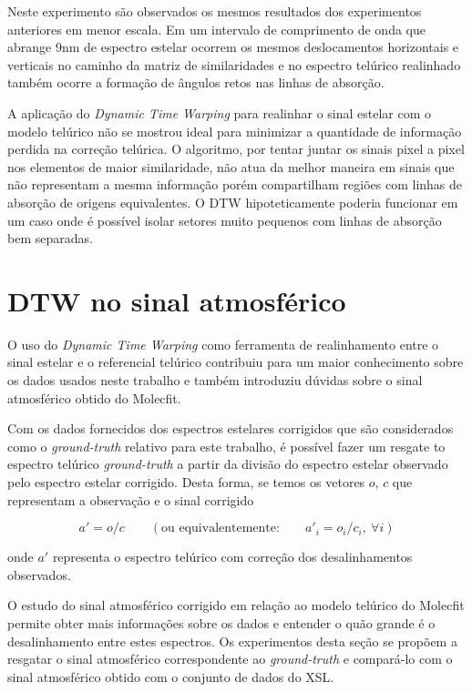 Neste experimento são observados os mesmos resultados dos experimentos anteriores em menor escala. Em um intervalo de comprimento de onda que abrange 9nm de espectro estelar ocorrem os mesmos deslocamentos horizontais e verticais no caminho da matriz de similaridades e no espectro telúrico realinhado também ocorre a formação de ângulos retos nas linhas de absorção.

A aplicação do \textit{Dynamic Time Warping} para realinhar o sinal estelar com o modelo telúrico não se mostrou ideal para minimizar a quantidade de informação perdida na correção telúrica. O algoritmo, por tentar juntar os sinais pixel a pixel nos elementos de maior similaridade, não atua da melhor maneira em sinais que não representam a mesma informação porém compartilham regiões com linhas de absorção de origens equivalentes. O DTW hipoteticamente poderia funcionar em um caso onde é possível isolar setores muito pequenos com linhas de absorção bem separadas.


\section{DTW no sinal atmosférico}

O uso do \textit{Dynamic Time Warping} como ferramenta de realinhamento entre o sinal estelar e o referencial telúrico contribuiu para um maior conhecimento sobre os dados usados neste trabalho e também introduziu dúvidas sobre o sinal atmosférico obtido do Molecfit.

Com os dados fornecidos dos espectros estelares corrigidos que são considerados como o \textit{ground-truth} relativo para este trabalho, é possível fazer um resgate to espectro telúrico \textit{ground-truth} a partir da divisão do espectro estelar observado pelo espectro estelar corrigido. Desta forma, se temos os vetores $o$, $c$ que representam a observação e o sinal corrigido

\begin{equation*}
    a' = o / c \qquad \left(\mbox{ou equivalentemente:} \qquad a'_{i} = o_i / c_i,\ \forall i\right)
\end{equation*}

\noindent onde $a'$ representa o espectro telúrico com correção dos desalinhamentos observados.

O estudo do sinal atmosférico corrigido em relação ao modelo telúrico do Molecfit permite obter mais informações sobre os dados e entender o quão grande é o desalinhamento entre estes espectros. Os experimentos desta seção se propõem a resgatar o sinal atmosférico correspondente ao \textit{ground-truth} e compará-lo com o sinal atmosférico obtido com o conjunto de dados do XSL.

